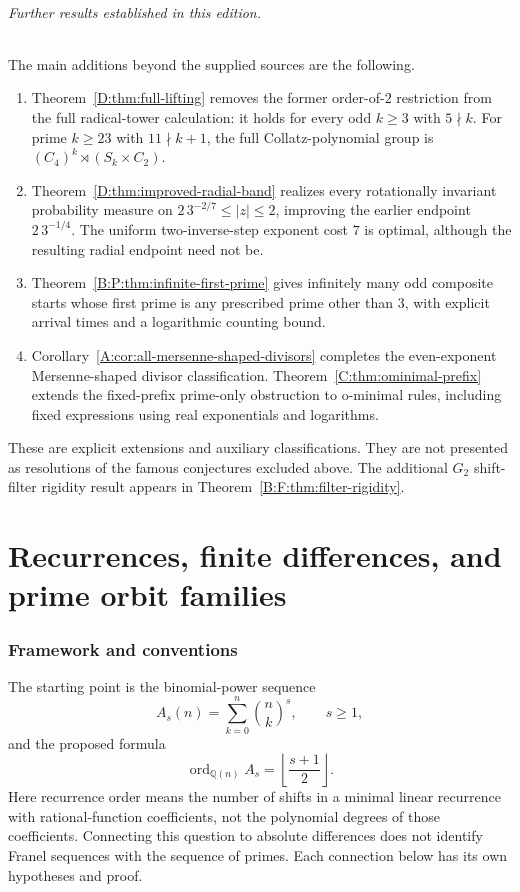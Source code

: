 \documentclass[11pt,a4paper]{article}
\theoremstyle{definition}
\theoremstyle{remark}
\numberwithin{equation}{section}
\newcommand{\Q}{\mathbb Q}\newcommand{\Z}{\mathbb Z}
\begin{document}
\paragraph{Further results established in this edition.}
The main additions beyond the supplied sources are the following.
\begin{enumerate}
\item Theorem~\ref{D:thm:full-lifting} removes the former order-of-$2$
restriction from the full radical-tower calculation: it holds for every
odd $k\ge3$ with $5\nmid k$. For prime $k\ge23$ with $11\nmid k+1$,
the full Collatz-polynomial group is $(C_4)^k\rtimes(S_k\times C_2)$.
\item Theorem~\ref{D:thm:improved-radial-band} realizes every rotationally
invariant probability measure on $2\,3^{-2/7}\le|z|\le2$, improving the
earlier endpoint $2\,3^{-1/4}$. The uniform two-inverse-step exponent
cost $7$ is optimal, although the resulting radial endpoint need not be.
\item Theorem~\ref{B:P:thm:infinite-first-prime} gives infinitely many
odd composite starts whose first prime is any prescribed prime other
than $3$, with explicit arrival times and a logarithmic counting bound.
\item Corollary~\ref{A:cor:all-mersenne-shaped-divisors} completes the
even-exponent Mersenne-shaped divisor classification. Theorem~\ref{C:thm:ominimal-prefix}
extends the fixed-prefix prime-only obstruction to o-minimal rules,
including fixed expressions using real exponentials and logarithms.
\end{enumerate}
These are explicit extensions and auxiliary classifications. They are not
presented as resolutions of the famous conjectures excluded above. The
additional $G_2$ shift-filter rigidity result appears in
Theorem~\ref{B:F:thm:filter-rigidity}.

\clearpage
\part{Recurrences, finite differences, and prime orbit families}\label{part:A}
\setcounter{section}{0}
\renewcommand{\thesection}{I.\arabic{section}}
\section{Framework and conventions}
The starting point is the binomial-power sequence
\[
A_s(n)=\sum_{k=0}^n\binom nk^s,\qquad s\ge1,
\]
and the proposed formula
\[
\operatorname{ord}_{\Q(n)}A_s=\left\lfloor\frac{s+1}{2}\right\rfloor.
\]
Here recurrence order means the number of shifts in a minimal linear recurrence
with rational-function coefficients, not the polynomial degrees of those
coefficients. Connecting this question to absolute differences does not identify
Franel sequences with the sequence of primes. Each connection below has its own
hypotheses and proof.
\end{document}
